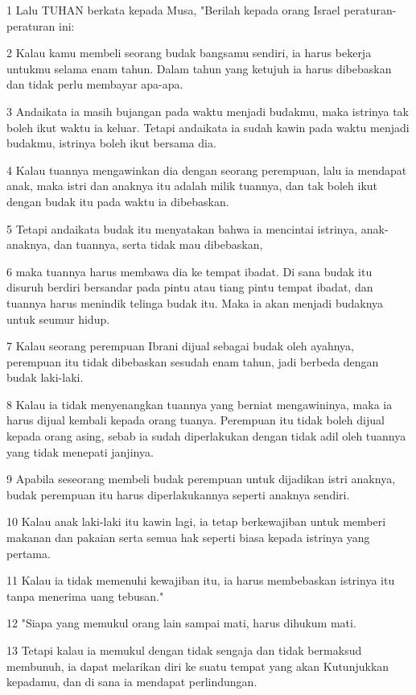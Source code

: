 \par 1 Lalu TUHAN berkata kepada Musa, "Berilah kepada orang Israel peraturan-peraturan ini:
\par 2 Kalau kamu membeli seorang budak bangsamu sendiri, ia harus bekerja untukmu selama enam tahun. Dalam tahun yang ketujuh ia harus dibebaskan dan tidak perlu membayar apa-apa.
\par 3 Andaikata ia masih bujangan pada waktu menjadi budakmu, maka istrinya tak boleh ikut waktu ia keluar. Tetapi andaikata ia sudah kawin pada waktu menjadi budakmu, istrinya boleh ikut bersama dia.
\par 4 Kalau tuannya mengawinkan dia dengan seorang perempuan, lalu ia mendapat anak, maka istri dan anaknya itu adalah milik tuannya, dan tak boleh ikut dengan budak itu pada waktu ia dibebaskan.
\par 5 Tetapi andaikata budak itu menyatakan bahwa ia mencintai istrinya, anak-anaknya, dan tuannya, serta tidak mau dibebaskan,
\par 6 maka tuannya harus membawa dia ke tempat ibadat. Di sana budak itu disuruh berdiri bersandar pada pintu atau tiang pintu tempat ibadat, dan tuannya harus menindik telinga budak itu. Maka ia akan menjadi budaknya untuk seumur hidup.
\par 7 Kalau seorang perempuan Ibrani dijual sebagai budak oleh ayahnya, perempuan itu tidak dibebaskan sesudah enam tahun, jadi berbeda dengan budak laki-laki.
\par 8 Kalau ia tidak menyenangkan tuannya yang berniat mengawininya, maka ia harus dijual kembali kepada orang tuanya. Perempuan itu tidak boleh dijual kepada orang asing, sebab ia sudah diperlakukan dengan tidak adil oleh tuannya yang tidak menepati janjinya.
\par 9 Apabila seseorang membeli budak perempuan untuk dijadikan istri anaknya, budak perempuan itu harus diperlakukannya seperti anaknya sendiri.
\par 10 Kalau anak laki-laki itu kawin lagi, ia tetap berkewajiban untuk memberi makanan dan pakaian serta semua hak seperti biasa kepada istrinya yang pertama.
\par 11 Kalau ia tidak memenuhi kewajiban itu, ia harus membebaskan istrinya itu tanpa menerima uang tebusan."
\par 12 "Siapa yang memukul orang lain sampai mati, harus dihukum mati.
\par 13 Tetapi kalau ia memukul dengan tidak sengaja dan tidak bermaksud membunuh, ia dapat melarikan diri ke suatu tempat yang akan Kutunjukkan kepadamu, dan di sana ia mendapat perlindungan.
